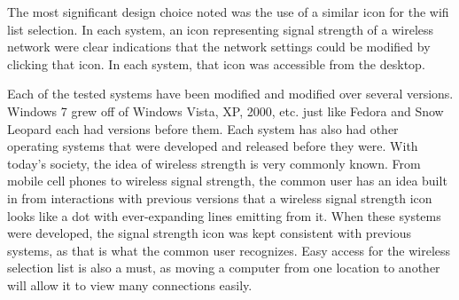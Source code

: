 \documentclass[11pt,letterpaper]{report}
\begin{document}
The most significant design choice noted was the use of a similar icon for the wifi list selection. In each system, an icon representing signal strength of a wireless network were clear indications that the network settings could be modified by clicking that icon. In each system, that icon was accessible from the desktop. 

Each of the tested systems have been modified and modified over several versions. Windows 7 grew off of Windows Vista, XP, 2000, etc. just like Fedora and Snow Leopard each had versions before them. Each system has also had other operating systems that were developed and released before they were. With today's society, the idea of wireless strength is very commonly known. From mobile cell phones to wireless signal strength, the common user has an idea built in from interactions with previous versions that a wireless signal strength icon looks like a dot with ever-expanding lines emitting from it. When these systems were developed, the signal strength icon was kept consistent with previous systems, as that is what the common user recognizes. Easy access for the wireless selection list is also a must, as moving a computer from one location to another will allow it to view many connections easily. 
\end{document}
